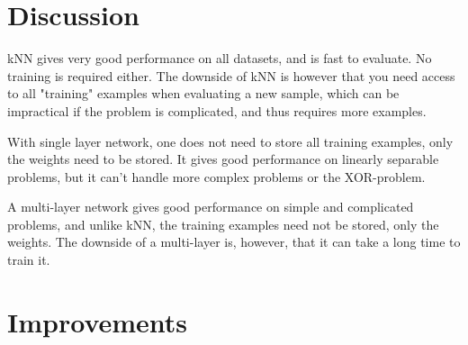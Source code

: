 \documentclass{article}
\begin{document}
\section{Discussion}

kNN gives very good performance on all datasets, and is fast to evaluate. No
training is required either. The downside of kNN is however that you need
access to all "training" examples when evaluating a new sample, which can be
impractical if the problem is complicated, and thus requires more examples.

With single layer network, one does not need to store all training examples,
only the weights need to be stored. It gives good performance on linearly
separable problems, but it can't handle more complex problems or the
XOR-problem.

A multi-layer network gives good performance on simple and complicated
problems, and unlike kNN, the training examples need not be stored, only
the weights. The downside of a multi-layer is, however, that it can take
a long time to train it.

\section{Improvements}
\end{document}
